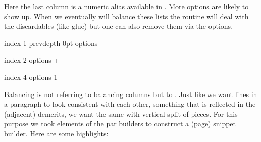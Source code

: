Here the last column is a numeric alias available in \CONTEXT. More options are
likely to show up. When we eventually will balance these lists the routine will
deal with the discardables (like glue) but one can also remove them via the
options.

\startbuffer
\beginmvl
    index     1
    prevdepth 0pt
    options  \discardtopmvloptioncode
\relax
\scratchdimen\prevdepth
\dontleavehmode
\quad\the\mvlcurrentlyactive\quad\the\scratchdimen
\quad\blackrule[height=\strutht,depth=\strutdp,color=darkred]
\endmvl

\stopbuffer

\typebuffer[option=TEX] \start \showmakeup[line] \getbuffer \stop

\startbuffer
\beginmvl
    index  2
    options \numexpr
                \ignoreprevdepthmvloptioncode
              + \discardtopmvloptioncode
            \relax
\relax
\scratchdimen\prevdepth
\dontleavehmode
\quad\the\mvlcurrentlyactive\quad\the\scratchdimen
\quad\blackrule[height=\strutht,depth=\strutdp,color=darkred]
\endmvl

\stopbuffer

\typebuffer[option=TEX] \start \showmakeup[line] \getbuffer \stop

\startbuffer
{} %
\scratchdimen\prevdepth
\dontleavehmode
\quad\the\mvlcurrentlyactive\quad\the\scratchdimen
\quad\blackrule[height=\strutht,depth=\strutdp,color=darkred]
\endmvl

\stopbuffer

\typebuffer[option=TEX] \start \showmakeup[line] \getbuffer \stop

\startbuffer
\beginmvl index 4 options 1
\scratchdimen\prevdepth
\dontleavehmode
\quad\the\mvlcurrentlyactive\quad\the\scratchdimen
\quad\blackrule[height=\strutht,depth=\strutdp,color=darkred]
\endmvl

\stopbuffer

\typebuffer[option=TEX] \start \showmakeup[line] \getbuffer \stop

\stopsectionlevel

\startsectionlevel[title=Balancing]

Balancing is not referring to balancing columns but to . Just like we want lines in a paragraph to look consistent
with each other, something that is reflected in the (adjacent) demerits, we want
the same with vertical split of pieces. For this purpose we took elements of the
par builders to construct a (page) snippet builder. Here are some highlights:

